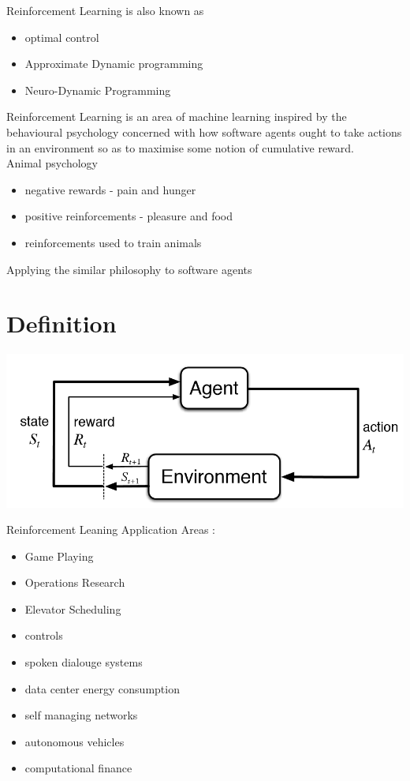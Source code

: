 \documentclass[../main.tex]{subfiles}
\begin{document}
Reinforcement Learning is also known as 
\begin{itemize}
    \item optimal control
    \item Approximate Dynamic programming
    \item Neuro-Dynamic Programming
\end{itemize}
Reinforcement Learning is an area of machine learning inspired by the behavioural psychology
concerned with how software agents ought to take actions in an environment so as to maximise 
some notion of cumulative reward.
\vspace{1pt}
\\
Animal psychology
\begin{itemize}
    \item negative rewards - pain and hunger
    \item positive reinforcements - pleasure and food
    \item reinforcements used to train animals
\end{itemize}
Applying the similar philosophy to software agents
\section{Definition}
\begin{center}
    \includegraphics*[scale = 0.3]{images/rl.png}   
\end{center}
\newpage
Reinforcement Leaning Application Areas : 
\begin{itemize}
    \item Game Playing
    \item Operations Research
    \item Elevator Scheduling
    \item controls 
    \item spoken dialouge systems
    \item data center energy consumption
    \item self managing networks
    \item autonomous vehicles
    \item computational finance
\end{itemize}
\end{document}
